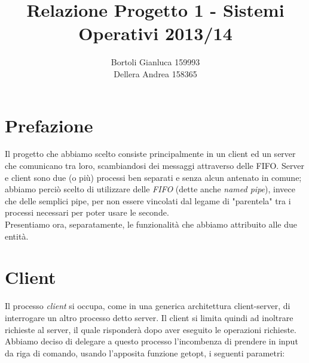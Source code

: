 \documentclass[a4paper,11pt]{article}
\begin{document}
\author{Bortoli Gianluca 159993\\Dellera Andrea 158365}
\title{Relazione Progetto 1 - Sistemi Operativi 2013/14}
\maketitle
\pagebreak

\section{Prefazione}
Il progetto che abbiamo scelto consiste principalmente in un client ed un server che comunicano tra loro, scambiandosi dei messaggi attraverso delle FIFO. Server e client sono due (o più) processi ben separati e senza alcun antenato in comune; abbiamo perciò scelto di utilizzare delle \emph{FIFO} (dette anche \emph{named pipe}), invece che delle semplici pipe, per non essere vincolati dal legame di "parentela" tra i processi necessari per poter usare le seconde.\\
Presentiamo ora, separatamente, le funzionalità che abbiamo attribuito alle due entità.

\section{Client}
Il processo \emph{client} si occupa, come in una generica architettura client-server, di interrogare un altro processo detto server. Il client si limita quindi ad inoltrare richieste al server, il quale risponderà dopo aver eseguito le operazioni richieste.\\
Abbiamo deciso di delegare a questo processo l'incombenza di prendere in input da riga di comando, usando l'apposita funzione getopt, i seguenti parametri:
\end{document}
